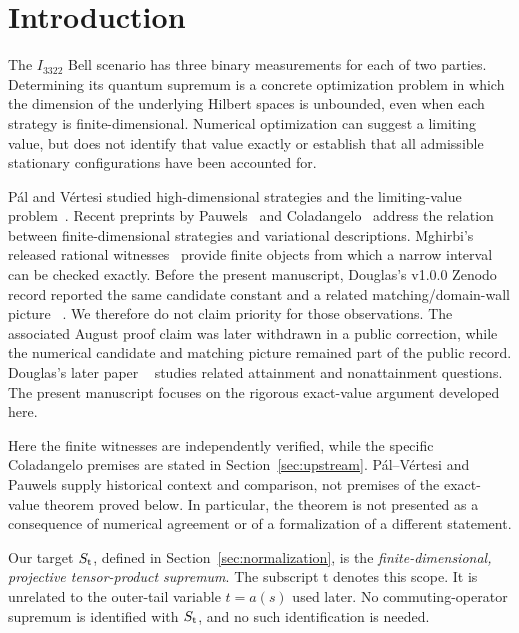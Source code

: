 \section{Introduction}\label{sec:introduction}
The \(I_{3322}\) Bell scenario has three binary measurements for each of two
parties. Determining its quantum supremum is a concrete optimization problem
in which the dimension of the underlying Hilbert spaces is unbounded, even
when each strategy is finite-dimensional. Numerical optimization can suggest
a limiting value, but does not identify that value exactly or establish that
all admissible stationary configurations have been accounted for.

P\'al and V\'ertesi studied high-dimensional strategies and the limiting-value
problem~\cite{PalVertesi2010}. Recent preprints by
Pauwels~\cite{Pauwels2026} and Coladangelo~\cite{Coladangelo2026v1} address the
relation between finite-dimensional strategies and variational descriptions.
Mghirbi's released rational witnesses~\cite{Mghirbi2026data,Mghirbi2026paper}
provide finite objects from which a narrow interval can be checked exactly.
Before the present manuscript, Douglas's v1.0.0 Zenodo record reported the
same candidate constant and a related matching/domain-wall picture
~\cite{Douglas2026Zenodo}. We therefore do not claim priority for those
observations. The associated August proof claim was later withdrawn in a
public correction, while the numerical candidate and matching picture
remained part of the public record. Douglas's later paper
~\cite{Douglas2026Arxiv} studies related attainment and nonattainment
questions. The present manuscript focuses on the rigorous exact-value
argument developed here.

Here the finite witnesses are independently verified, while the specific
Coladangelo premises are stated in Section~\ref{sec:upstream}. P\'al--V\'ertesi
and Pauwels supply historical context and comparison, not premises of the
exact-value theorem proved below. In particular, the theorem is not presented
as a consequence of numerical agreement or of a formalization of a different
statement.

Our target \(S_{\mathrm t}\), defined in Section~\ref{sec:normalization}, is the
\emph{finite-dimensional, projective tensor-product supremum}. The subscript
\(\mathrm t\) denotes this scope. It is unrelated to the outer-tail variable
\(t=a(s)\) used later. No commuting-operator supremum is identified with
\(S_{\mathrm t}\), and no such identification is needed.

